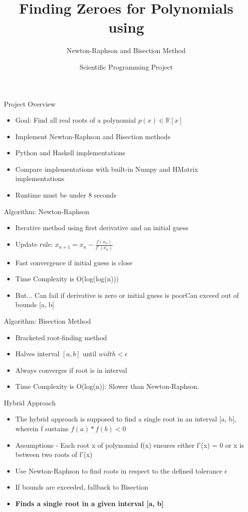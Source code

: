 \documentclass{beamer}
\title{Finding Zeroes for Polynomials using}
\subtitle{Newton-Raphson and Bisection Method}
\author{Scientific Programming Project}
\begin{document}
\frame{\titlepage}

\begin{frame}{Project Overview}
\begin{itemize}
    \item Goal: Find all real roots of a polynomial \( p(x) \in \mathbb{R}[x] \)
    \item Implement Newton-Raphson and Bisection methods
    \item Python and Haskell implementations
    \item Compare implementations with built-in Numpy and HMatrix implementations
    \item Runtime must be under 8 seconds
\end{itemize}
\end{frame}

\begin{frame}{Algorithm: Newton-Raphson}
\begin{itemize}
    \item Iterative method using first derivative and an initial guess
    \item Update rule: \( x_{n+1} = x_n - \frac{f(x_n)}{f'(x_n)} \)
    \item Fast convergence if initial guess is close
    \item Time Complexity is O(log(log(n)))
    \item But... Can fail if derivative is zero or initial guess is poor\newline Can exceed out of bounds [a, b]
\end{itemize}
\end{frame}

\begin{frame}{Algorithm: Bisection Method}
\begin{itemize}
    \item Bracketed root-finding method
    \item Halves interval \([a, b]\) until $width < \epsilon\ $ \
    \item Always converges if root is in interval
    \item Time Complexity is O(log(n)). Slower than Newton-Raphson.
\end{itemize}
\end{frame}

\begin{frame}{Hybrid Approach}
\begin{itemize}
    \item The hybrid approach is supposed to find a single root in an interval [a, b], wherein f sustains $f(a)*f(b) < 0 $
    \item Assumptions - Each root x of polynomial f(x) ensures either f'(x) = 0 or x is between two roots of f'(x)
    \item Use Newton-Raphson to find roots in respect to the defined tolerance $\epsilon\ $ \
    \item If bounds are exceeded, fallback to Bisection
    \item \textbf{Finds a single root in a given interval [a, b]}
\end{itemize}
\end{frame}
\end{document}
